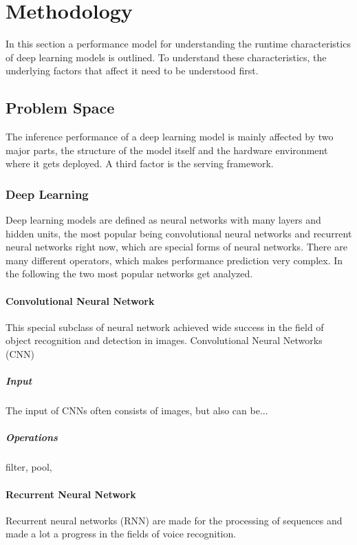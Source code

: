 \chapter{Methodology}
In this section a performance model for understanding the runtime characteristics of deep learning models is outlined. To understand these characteristics, the underlying factors that affect it need to be understood first. 
\section{Problem Space}
The inference performance of a deep learning model is mainly affected by two major parts, the structure of the model itself and the hardware environment where it gets deployed. A third factor is the serving framework.

\subsection{Deep Learning}
Deep learning models are defined as neural networks with many layers and hidden units, the most popular being convolutional neural networks and recurrent neural networks right now, which are special forms of neural networks.
There are many different operators, which makes performance prediction very complex.
In the following the two most popular networks get analyzed.
\subsubsection{Convolutional Neural Network}
This special subclass of neural network achieved wide success in the field of object recognition and detection in images. Convolutional Neural Networks (CNN)
\paragraph{Input}
The input of CNNs often consists of images, but also can be...

\paragraph{Operations}
filter, pool, 
\subsubsection{Recurrent Neural Network}
Recurrent neural networks (RNN) are made for the processing of sequences and made a lot a progress in the fields of voice recognition.
